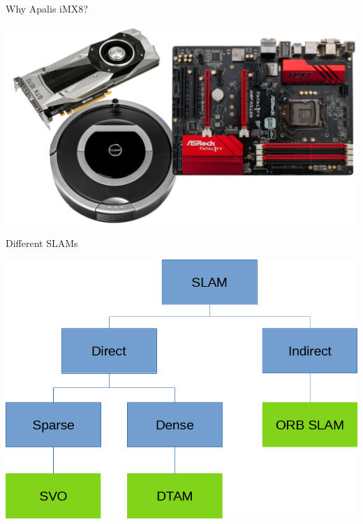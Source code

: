 \documentclass[aspectratio=169]{beamer}
\begin{document}
\note{
}

\begin{frame}{Why Apalis iMX8?}
  \begin{center}
    \includegraphics[height=0.9\textheight]{./img/robot_size.png}
  \end{center}
\end{frame}

\note{
}

\begin{frame}{Different SLAMs}
  \begin{center}
    \includegraphics[height=0.9\textheight]{./img/slam_modes.png}
  \end{center}
\end{frame}

\note{
}
\end{document}

